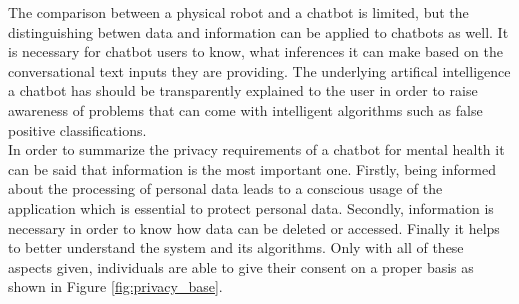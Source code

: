 \documentclass[sigconf, nonacm]{acmart}
\begin{document}
The comparison between a physical robot and a chatbot is limited, but the distinguishing betwen data and information can be applied to chatbots as well. It is necessary for chatbot users to know, what inferences it can make based on the conversational text inputs they are providing. The underlying artifical intelligence a chatbot has should be transparently explained 
to the user in order to raise awareness of problems that can come with intelligent algorithms such as false positive classifications.
\\
In order to summarize the privacy requirements of a chatbot for mental health it can be said that information is the most important one. Firstly, being informed about the processing of personal data leads to a conscious usage of the application which is essential to protect personal data. Secondly, information is necessary in order to know how data can be deleted or accessed. Finally it helps to better understand the system and 
its algorithms. Only with all of these aspects given, individuals are able to give their consent on a proper basis as shown in Figure \ref{fig:privacy_base}. 
\end{document}

